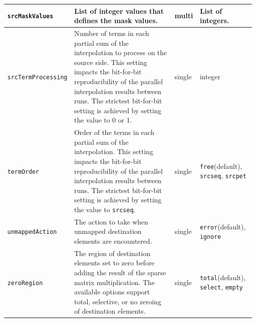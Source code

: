 \begin{longtable}{|p{5cm}|p{5cm}|p{1cm}|p{35mm}|}
     {\tt srcMaskValues} & List of integer values that defines the mask values. & multi & List of integers.\\ \hline
     {\tt srcTermProcessing} & Number of terms in each partial sum of the interpolation to process on the source side. This setting impacts the bit-for-bit reproducibility of the parallel interpolation results between runs. The strictest bit-for-bit setting is achieved by setting the value to 0 or 1. & single & integer\\ \hline
     {\tt termOrder} & Order of the terms in each partial sum of the interpolation. This setting impacts the bit-for-bit reproducibility of the parallel interpolation results between runs. The strictest bit-for-bit setting is achieved by setting the value to {\tt srcseq}. & single & {\tt free}(default), {\tt srcseq}, {\tt srcpet}\\ \hline
     {\tt unmappedAction} & The action to take when unmapped destination elements are encountered. & single & {\tt error}(default), {\tt ignore}\\ \hline
     {\tt zeroRegion} & The region of destination elements set to zero before adding the result of the sparse matrix multiplication. The available options support total, selective, or no zeroing of destination elements. & single & {\tt total}(default), {\tt select}, {\tt empty}\\ \hline
     \hline
\end{longtable}

